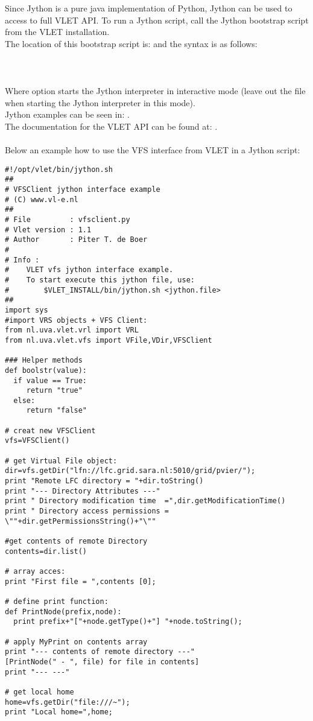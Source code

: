 Since Jython is a pure java implementation of Python, Jython can be used 
to access to full VLET API. To run  a Jython script, call the Jython 
bootstrap script from the VLET installation. \\
The location of this bootstrap script is:  and
the syntax is as follows: \\
\\
\tab {}\\
\\
Where option  starts the Jython interpreter in interactive mode (leave
out the file when starting the Jython interpreter in this mode). \\
Jython examples can be seen in: . 
\\
The documentation for the VLET API can be found at: 
. \\ 
\\ 
Below an example how to use the VFS interface from VLET in a Jython 
script:

\hspace*{5mm}\begin{boxedminipage}{165mm}
\begin{verbatim}
#!/opt/vlet/bin/jython.sh
##
# VFSClient jython interface example
# (C) www.vl-e.nl 
##
# File         : vfsclient.py 
# Vlet version : 1.1
# Author       : Piter T. de Boer 
#
# Info :  
#    VLET vfs jython interface example.
#    To start execute this jython file, use:
#        $VLET_INSTALL/bin/jython.sh <jython.file> 
##
import sys
#import VRS objects + VFS Client: 
from nl.uva.vlet.vrl import VRL
from nl.uva.vlet.vfs import VFile,VDir,VFSClient

### Helper methods
def boolstr(value):
  if value == True: 
     return "true" 
  else:
     return "false" 
     
# creat new VFSClient
vfs=VFSClient()

# get Virtual File object: 
dir=vfs.getDir("lfn://lfc.grid.sara.nl:5010/grid/pvier/"); 
print "Remote LFC directory = "+dir.toString()
print "--- Directory Attributes ---" 
print " Directory modification time  =",dir.getModificationTime()
print " Directory access permissions = \""+dir.getPermissionsString()+"\"" 

#get contents of remote Directory 
contents=dir.list()

# array acces: 
print "First file = ",contents [0];

# define print function: 
def PrintNode(prefix,node):
  print prefix+"["+node.getType()+"] "+node.toString();

# apply MyPrint on contents array
print "--- contents of remote directory ---"
[PrintNode(" - ", file) for file in contents]
print "--- ---"

# get local home 
home=vfs.getDir("file:///~"); 
print "Local home=",home; 
\end{verbatim}
\end{boxedminipage}


